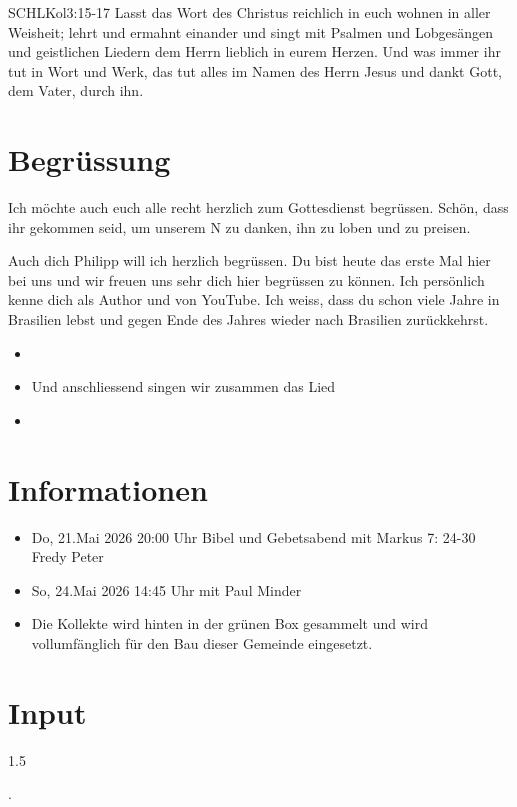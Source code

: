 \documentclass[fontsize=14pt]{mybib}
\newcommand{\Name}{Philipp}
\begin{document}
\begin{bibelbox}{SCHL}{Kol}{3:15-17}
    Lasst das Wort des Christus reichlich in euch wohnen in aller Weisheit; lehrt und ermahnt einander und singt mit Psalmen und Lobgesängen und geistlichen Liedern dem Herrn lieblich in eurem Herzen. Und was immer ihr tut in Wort und Werk, das tut alles im Namen des Herrn Jesus und dankt Gott, dem Vater, durch ihn.
\end{bibelbox}
\section{Begrüssung}
Ich möchte auch euch alle recht herzlich zum Gottesdienst begrüssen. Schön, dass ihr gekommen seid, um unserem \herr N zu danken, ihn zu loben und zu preisen.

Auch dich \Name{} will ich herzlich begrüssen. Du bist heute das erste Mal hier bei uns und wir freuen uns sehr dich hier begrüssen zu können. Ich persönlich kenne dich als Author und von YouTube. Ich weiss, dass du schon viele Jahre in Brasilien lebst und gegen Ende des Jahres wieder nach Brasilien zurückkehrst.
\begin{itemize}
    \item[] 
    \item[] Und anschliessend singen wir zusammen das Lied
    \item[] 
\end{itemize}

\section{Informationen}
\begin{itemize}
    \item {} Do, 21.Mai 2026 20:00 Uhr Bibel und Gebetsabend mit Markus 7: 24-30 Fredy Peter
    \item {} So, 24.Mai 2026 14:45 Uhr mit Paul Minder
    \item {} Die Kollekte wird hinten in der grünen Box gesammelt und wird vollumfänglich für den Bau dieser Gemeinde eingesetzt.
\end{itemize}

\section{ Input }
\begin{spacing}{1.5}
    
    .
\end{spacing}
\end{document}
